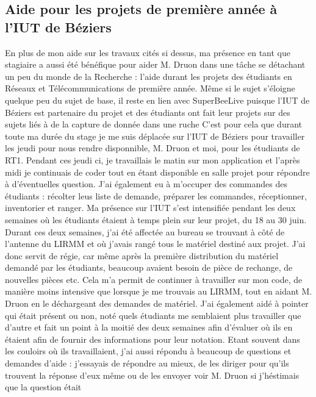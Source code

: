 \documentclass[11pt,french,a4paper]{report}
\begin{document}
        \subsection{Aide pour les projets de première année à l'IUT de Béziers}

En plus de mon aide sur les travaux cités si dessus, ma présence en tant que stagiaire a aussi été bénéfique pour aider M. Druon dans une tâche se
détachant un peu du monde de la Recherche : l'aide durant les projets des étudiants en Réseaux et Télécommunications de première année.
Même si le sujet s'éloigne quelque peu du sujet de base, il reste en lien avec SuperBeeLive puisque l'IUT de Béziers est partenaire du projet et 
des étudiants ont fait leur projets sur des sujets liés à de la capture de donnée dans une ruche %
C'est pour cela que durant toute ma durée du stage je me suis déplacée sur l'IUT de Béziers pour travailler les jeudi pour nous rendre disponnible, 
M. Druon et moi, pour les étudiants de RT1. Pendant ces jeudi ci, je travaillais le matin sur mon application et l'après midi je continuais 
de coder tout en étant disponible en salle projet pour répondre à d'éventuelles question. J'ai également eu à m'occuper des commandes des étudiants :
récolter leus liste de demande, préparer les commandes, réceptionner, inventorier et ranger. Ma présence sur l'IUT s'est intensifiée pendant les deux
semaines où les étudiants étaient à temps plein sur leur projet, du 18 au 30 juin. \\
Durant ces deux semaines, j'ai été affectée au bureau se trouvant à côté de l'antenne du LIRMM et où j'avais rangé tous le matériel destiné aux projet.
J'ai donc servit de régie, car même après la première distribution du matériel demandé par les étudiants, beaucoup avaient besoin de pièce de rechange, 
de nouvelles pièces etc. Cela m'a permit de continuer à travailler sur mon code, de manière moins intensive que lorsque je me trouvais au LIRMM, tout en
aidant M. Druon en le déchargeant des demandes de matériel. J'ai également aidé à pointer qui était présent ou non, noté quels étudiants me semblaient 
plus travailler que d'autre et fait un point à la moitié des deux semaines afin d'évaluer où ils en étaient afin de fournir des informations pour leur 
notation. Etant souvent dans les couloirs où ils travaillaient, j'ai aussi répondu à beaucoup de questions et demandes d'aide : j'essayais de répondre 
au mieux, de les diriger pour qu'ils trouvent la réponse d'eux même ou de les envoyer voir M. Druon si j'héstimais que la question était 
\end{document}
